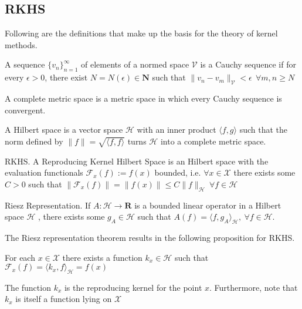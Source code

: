 \subsection{RKHS}
Following are the definitions that make up the basis for the theory of kernel methods.


\begin{definition}
    A sequence $\{v_n\}_{n=1}^{\infty}$ of elements of a normed space $\mathcal{V}$ is a Cauchy sequence if for every $\epsilon>0$, there exist $N=N(\epsilon) \in \mathbf{N}$ such that $\|v_n-v_m\|_{\mathcal{V}}<\epsilon \ \ \forall m,n\geq N$  
\end{definition}


\begin{definition}
    A complete metric space is a metric space in which every Cauchy sequence is convergent.
\end{definition}


\begin{definition}
    A Hilbert space is a vector space $\mathcal{H}$ with an inner product $\langle f, g \rangle$ such that the norm defined by $\|f\|=\sqrt{\langle f, f \rangle}$
turns $\mathcal{H}$ into a complete metric space.
\end{definition}

\begin{definition}
    RKHS.
    A Reproducing Kernel Hilbert Space is an Hilbert space with the evaluation functionals $\mathcal{F}_{x}(f):=f(x)$ bounded, i.e. $\forall x \in \mathcal{X}$ there exists some $C>0$ such that $\| \mathcal{F}_{x}(f)\|=\|f(x)\| \leq C \|f\|_{\mathcal{H}} \ \forall f \in \mathcal{H}$
\end{definition}


\begin{theorem}
    Riesz Representation. If $A : \mathcal{H} \rightarrow \mathbf{R}$ is a bounded linear operator in a Hilbert space $\mathcal{H}$ , there exists some $g_{A} \in \mathcal{H}$ such that $A(f) = \langle f,g_A\rangle_\mathcal{H}, \ \forall f \in \mathcal{H}$.
\end{theorem}


The Riesz representation theorem results in the following proposition for RKHS.
\begin{proposition}
For each $x \in \mathcal{X}$ there exists a function $k_{x} \in \mathcal{H}$ such that $\mathcal{F}_{x}(f)=\langle k_{x}, f\rangle_{\mathcal{H}}=f(x)$    
\end{proposition}

The function $k_{x}$ is the reproducing kernel for the point $x$.
Furthermore, note that $k_{x}$ is itself a function lying on $\mathcal{X}$

